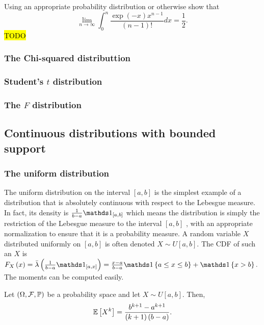 \begin{example}
\label{exa:isi2009samplepsb3}
Using an appropriate probability distribution or otherwise show that
$$
\lim _{n \rightarrow \infty} \int_0^n \frac{\exp (-x) x^{n-1}}{(n-1)!} d x=\frac{1}{2} .
$$
\hl{TODO}
\end{example}

\subsubsection{The Chi-squared distributtion}

\subsubsection{Student's $t$ distribution}

\subsubsection{The $F$ distribution}

\subsection{Continuous distributions with bounded support}

\subsubsection{The uniform distribution\label{subsec:uniformDistribution}}

The uniform distribution on the interval $\left[a,b\right]$ is the
simplest example of a distribution that is absolutely continuous with
respect to the Lebesgue measure. In fact, its density is $\frac{1}{b-a}\indicate_{\left[a,b\right]}$
which means the distribution is simply the restriction of the Lebesgue
measure to the interval $\left[a,b\right]$ , with an appropriate
normalization to ensure that it is a probability measure. A random
variable $X$ distributed uniformly on $\left[a,b\right]$ is often
denoted $X\sim U\left[a,b\right]$. The CDF of such an $X$ is $F_{X}\left(x\right)=\lebInt{\lambda}{\frac{1}{b-a}\indicate_{\left[a,x\right]}}=\frac{x-a}{b-a}\indicate\left\{ a\leq x\leq b\right\} +\indicate\left\{ x>b\right\} .$
The moments can be computed easily.
\begin{prop}
\label{prop:momentsUniformDistribution}Let $\left(\Omega,\mathcal{F},\mathbb{\mathbb{\mathbb{P}}}\right)$ be
a probability space and let $X\sim U\left[a,b\right]$. Then,
\begin{align*}
\mathbb{E}\left[X^{k}\right] & =\frac{b^{k+1}-a^{k+1}}{(k+1)\left(b-a\right)}.\\
\end{align*}
\end{prop}

